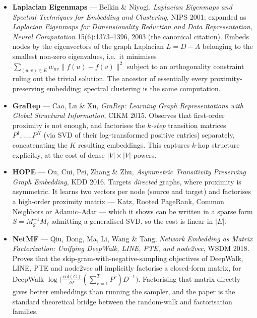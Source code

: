 \begin{itemize}[label=$\bullet$,leftmargin=1.3em]
  \item \textbf{Laplacian Eigenmaps} --- Belkin \& Niyogi, \emph{Laplacian Eigenmaps and
        Spectral Techniques for Embedding and Clustering}, NIPS 2001; expanded as
        \emph{Laplacian Eigenmaps for Dimensionality Reduction and Data Representation},
        \emph{Neural Computation} 15(6):1373--1396, 2003 (the canonical citation).
        Embeds nodes by the eigenvectors of the graph Laplacian $L = D - A$ belonging to
        the smallest non-zero eigenvalues, i.e.\ it minimises
        $\sum_{(u,v)\in E} w_{uv}\lVert f(u)-f(v)\rVert^2$ subject to an orthogonality
        constraint ruling out the trivial solution. The ancestor of essentially every
        proximity-preserving embedding; spectral clustering is the same computation.
  \item \textbf{GraRep} --- Cao, Lu \& Xu, \emph{GraRep: Learning Graph Representations with
        Global Structural Information}, CIKM 2015.
        Observes that first-order proximity is not enough, and factorises the
        \emph{$k$-step} transition matrices $P^1,\dots,P^K$ (via SVD of their log-transformed
        positive entries) separately, concatenating the $K$ resulting embeddings. This
        captures $k$-hop structure explicitly, at the cost of dense $|V|\times|V|$ powers.
  \item \textbf{HOPE} --- Ou, Cui, Pei, Zhang \& Zhu, \emph{Asymmetric Transitivity
        Preserving Graph Embedding}, KDD 2016.
        Targets \emph{directed} graphs, where proximity is asymmetric. It learns two
        vectors per node (source and target) and factorises a high-order proximity matrix
        --- Katz, Rooted PageRank, Common Neighbors or Adamic--Adar --- which it shows can
        be written in a sparse form $S = M_g^{-1}M_\ell$ admitting a generalised SVD, so the
        cost is linear in $|E|$.
  \item \textbf{NetMF} --- Qiu, Dong, Ma, Li, Wang \& Tang, \emph{Network Embedding as
        Matrix Factorization: Unifying DeepWalk, LINE, PTE, and node2vec}, WSDM 2018.
        Proves that the skip-gram-with-negative-sampling objectives of DeepWalk, LINE, PTE
        and node2vec all implicitly factorise a closed-form matrix, for DeepWalk
        $\log\bigl(\tfrac{\mathrm{vol}(G)}{bT}(\sum_{r=1}^{T}P^r)D^{-1}\bigr)$. Factorising
        that matrix directly gives better embeddings than running the sampler, and the
        paper is the standard theoretical bridge between the random-walk and
        factorisation families.
\end{itemize}

